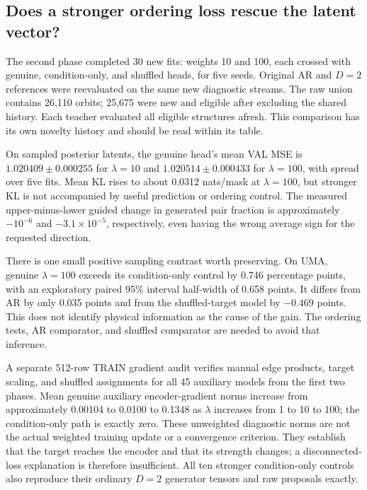 \subsection{Does a stronger ordering loss rescue the latent vector?}
The second phase completed 30 new fits: weights 10 and 100, each crossed
with genuine, condition-only, and shuffled heads, for five seeds. Original
AR and $D=2$ references were reevaluated on the same new diagnostic streams.
The raw union contains 26,110 orbits; 25,675 were new and eligible after
excluding the shared history. Each teacher evaluated all eligible structures
afresh. This comparison has its own novelty history and should be read
within its table.



On sampled posterior latents, the genuine head's mean VAL MSE is
$1.020409\pm0.000255$ for $\lambda=10$ and
$1.020514\pm0.000433$ for $\lambda=100$, with spread over five fits.
Mean KL rises to about 0.0312 nats/mask at $\lambda=100$, but stronger KL is
not accompanied by useful prediction or ordering control. The measured
upper-minus-lower guided change in generated pair fraction is approximately
$-10^{-6}$ and $-3.1\times10^{-5}$, respectively, even having the wrong
average sign for the requested direction.

There is one small positive sampling contrast worth preserving. On UMA,
genuine $\lambda=100$ exceeds its condition-only control by 0.746 percentage
points, with an exploratory paired 95\% interval half-width of 0.658 points.
It differs from AR by only 0.035 points and from the shuffled-target model
by $-0.469$ points. This does not identify physical information as the cause
of the gain. The ordering tests, AR comparator, and shuffled comparator are
needed to avoid that inference.

A separate 512-row TRAIN gradient audit verifies manual edge products,
target scaling, and shuffled assignments for all 45 auxiliary models from
the first two phases. Mean genuine auxiliary encoder-gradient norms increase
from approximately 0.00104 to 0.0100 to 0.1348 as $\lambda$ increases from 1
to 10 to 100; the condition-only path is exactly zero. These unweighted
diagnostic norms are not the actual weighted training update or a
convergence criterion. They establish that the target reaches the encoder
and that its strength changes; a disconnected-loss explanation is therefore
insufficient. All ten stronger condition-only controls also reproduce their
ordinary $D=2$ generator tensors and raw proposals exactly.


